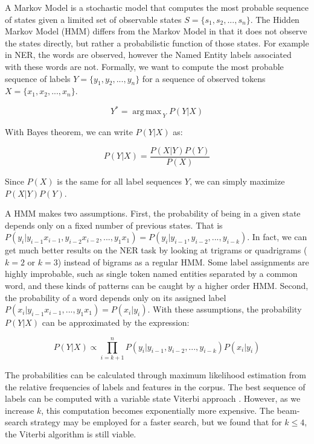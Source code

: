 \documentclass[sigconf]{acmart}
\DeclareMathOperator*{\argmax}{arg\,max\,}
\begin{document}
A Markov Model is a stochastic model that computes the most probable sequence of states 
given a limited set of observable states $ S = \{s_1, s_2, ..., s_n \} $.
The Hidden Markov Model (HMM) differs from the Markov Model in that it
does not observe the states directly, but rather a probabilistic function of those 
states. For example in NER, the words are observed, however the Named Entity labels
associated with these words are not. Formally, we want to compute the most probable
sequence of labels $ Y = \{y_1, y_2, ..., y_n\} $ for a sequence of observed tokens
$ X = \{x_1, x_2, ..., x_n\} $.

\begin{equation}
Y^* = \argmax_{Y} P(Y|X)
\end{equation}

With Bayes theorem, we can write $ P(Y|X) $ as:

\begin{equation}
P(Y|X) = \frac{P(X|Y) P(Y)}{P(X)}
\end{equation}

Since $ P(X) $ is the same for all label sequences $ Y $, we can simply maximize
$ P(X|Y) P(Y) $.

A HMM makes two assumptions. First, the probability of being in a given state depends 
only on a fixed number of previous states. That is 
$ P(y_i|y_{i-1}x_{i-1}, y_{i-2}x_{i-2}, ..., y_1x_1) = P(y_i|y_{i-1}, y_{i-2},..., y_{i-k}) $. 
In fact, we can get much better results on the NER task by looking at trigrams
or quadrigrams ($ k = 2 $ or $ k = 3 $) instead of bigrams as a regular HMM. 
Some label assignments are highly improbable, such as single token named entities 
separated by a common word, and these kinds of patterns can be caught by a higher order HMM.
Second, the probability of a word depends only on its assigned label 
$ P(x_i|y_{i-1}x_{i-1}, ..., y_1x_1) = P(x_i|y_i) $. With these assumptions, 
the probability $ P(Y|X) $ can be approximated by the expression:

\begin{equation}
P(Y|X) \propto \prod_{i=k+1}^{n} P(y_i|y_{i-1}, y_{i-2}, ..., y_{i-k}) P(x_i|y_i)
\end{equation}

The probabilities can be calculated through maximum likelihood estimation from the relative
frequencies of labels and features in the corpus. The best sequence of labels can be computed 
with a variable state Viterbi approach \cite{Li2000}. However, as we increase $ k $, this computation 
becomes exponentially more expensive. The beam-search strategy may be employed for a faster 
search, but we found that for $ k \leq 4 $, the Viterbi algorithm is still viable.
\end{document}
